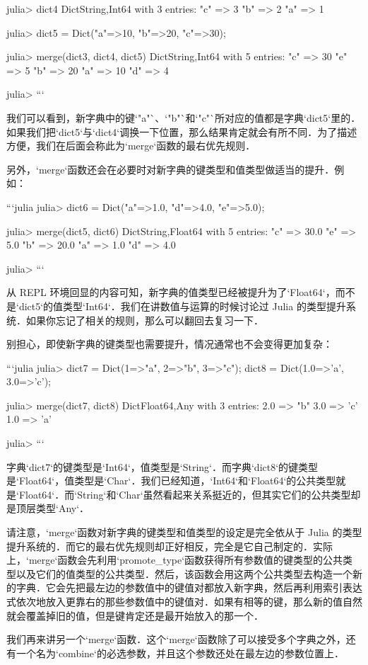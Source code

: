 julia> dict4
Dict{String,Int64} with 3 entries:
  "c" => 3
  "b" => 2
  "a" => 1

julia> dict5 = Dict("a"=>10, "b"=>20, "c"=>30);

julia> merge(dict3, dict4, dict5)
Dict{String,Int64} with 5 entries:
  "c" => 30
  "e" => 5
  "b" => 20
  "a" => 10
  "d" => 4

julia> 
```

我们可以看到，新字典中的键`"a"`、`"b"`和`"c"`所对应的值都是字典`dict5`里的．如果我们把`dict5`与`dict4`调换一下位置，那么结果肯定就会有所不同．为了描述方便，我们在后面会称此为`merge`函数的最右优先规则．

另外，`merge`函数还会在必要时对新字典的键类型和值类型做适当的提升．例如：

```julia
julia> dict6 = Dict("a"=>1.0, "d"=>4.0, "e"=>5.0);

julia> merge(dict5, dict6)
Dict{String,Float64} with 5 entries:
  "c" => 30.0
  "e" => 5.0
  "b" => 20.0
  "a" => 1.0
  "d" => 4.0

julia> 
```

从 REPL 环境回显的内容可知，新字典的值类型已经被提升为了`Float64`，而不是`dict5`的值类型`Int64`．我们在讲数值与运算的时候讨论过 Julia 的类型提升系统．如果你忘记了相关的规则，那么可以翻回去复习一下．

别担心，即使新字典的键类型也需要提升，情况通常也不会变得更加复杂：

```julia
julia> dict7 = Dict(1=>"a", 2=>"b", 3=>"c"); dict8 = Dict(1.0=>'a', 3.0=>'c');

julia> merge(dict7, dict8)
Dict{Float64,Any} with 3 entries:
  2.0 => "b"
  3.0 => 'c'
  1.0 => 'a'

julia> 
```

字典`dict7`的键类型是`Int64`，值类型是`String`．而字典`dict8`的键类型是`Float64`，值类型是`Char`．我们已经知道，`Int64`和`Float64`的公共类型就是`Float64`．而`String`和`Char`虽然看起来关系挺近的，但其实它们的公共类型却是顶层类型`Any`．

请注意，`merge`函数对新字典的键类型和值类型的设定是完全依从于 Julia 的类型提升系统的．而它的最右优先规则却正好相反，完全是它自己制定的．实际上，`merge`函数会先利用`promote_type`函数获得所有参数值的键类型的公共类型以及它们的值类型的公共类型．然后，该函数会用这两个公共类型去构造一个新的字典．它会先把最左边的参数值中的键值对都放入新字典，然后再利用索引表达式依次地放入更靠右的那些参数值中的键值对．如果有相等的键，那么新的值自然就会覆盖掉旧的值，但是键肯定还是最开始放入的那一个．

我们再来讲另一个`merge`函数．这个`merge`函数除了可以接受多个字典之外，还有一个名为`combine`的必选参数，并且这个参数还处在最左边的参数位置上．

